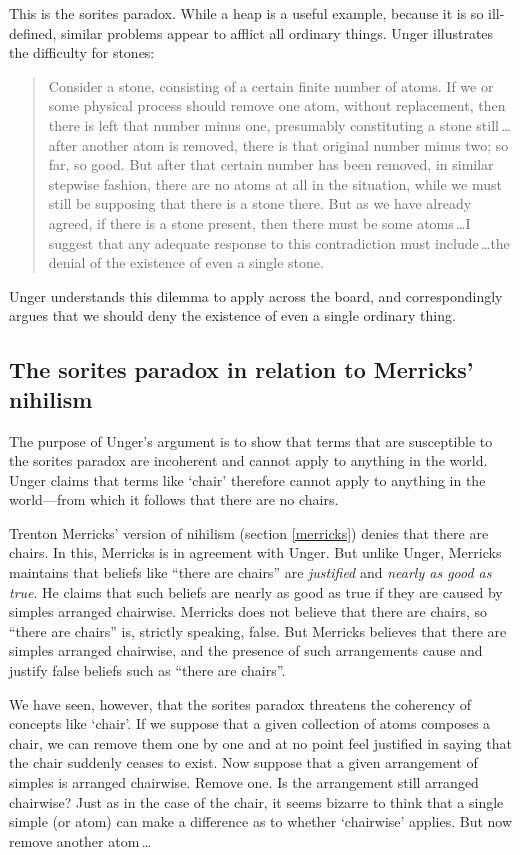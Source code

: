\documentclass[11pt]{article}
\newenvironment{squote}{%
	\begin{quote}\begin{singlespace}%
	}{%
	\end{singlespace}\end{quote}}
\begin{document}
\begin{spacing}{1.5}
This is the sorites paradox.  While a heap is a useful example,
because it is so ill-defined, similar problems appear to afflict all
ordinary things.  Unger illustrates the difficulty for stones:

\begin{squote}
Consider a stone, consisting of a certain finite number of atoms.  If
we or some physical process should remove one atom, without
replacement, then there is left that number minus one, presumably
constituting a stone still\,\ldots after another atom is removed,
there is that original number minus two; so far, so good.  But after
that certain number has been removed, in similar stepwise fashion,
there are no atoms at all in the situation, while we must still be
supposing that there is a stone there.  But as we have already agreed,
if there is a stone present, then there must be some atoms\,\ldots I
suggest that any adequate response to this contradiction must
include\,\ldots the denial of the existence of even a single
stone.~\citep[121--122]{unger1979}
\end{squote}
Unger understands this dilemma to apply across the board, and
correspondingly argues that we should deny the existence of even a
single ordinary thing.

\subsection{The sorites paradox in relation to Merricks' nihilism}
\label{sorites-m}
The purpose of Unger's argument is to show that terms that are
susceptible to the sorites paradox are incoherent and cannot apply to
anything in the world.  Unger claims that terms like `chair' therefore
cannot apply to anything in the world---from which it follows that
there are no chairs.

Trenton Merricks' version of nihilism (section \ref{merricks}) denies
that there are chairs.  In this, Merricks is in agreement with Unger.
But unlike Unger, Merricks maintains that beliefs like ``there are
chairs'' are {\em justified} and {\em nearly as good as true}.  He
claims that such beliefs are nearly as good as true if they are caused
by simples arranged chairwise.  Merricks does not believe that there
are chairs, so ``there are chairs'' is, strictly speaking, false.  But
Merricks believes that there are simples arranged chairwise, and the
presence of such arrangements cause and justify false beliefs such as
``there are chairs''.

We have seen, however, that the sorites paradox threatens the
coherency of concepts like `chair'.  If we suppose that a given
collection of atoms composes a chair, we can remove them one by one
and at no point feel justified in saying that the chair suddenly
ceases to exist.  Now suppose that a given arrangement of simples is
arranged chairwise.  Remove one.  Is the arrangement still arranged
chairwise?  Just as in the case of the chair, it seems bizarre to
think that a single simple (or atom) can make a difference as to
whether `chairwise' applies.  But now remove another atom\,\ldots


\end{spacing}
\end{document}
